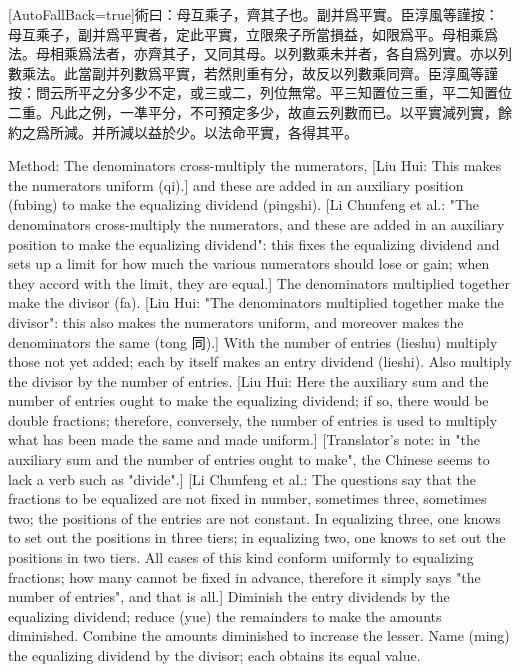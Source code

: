 \documentclass[11pt]{article}
\newcommand{\zhsmall}{\footnotesize\color{black!70}}
\newcommand{\unitlabel}[1]{\marginpar{\raggedleft\tiny\color{gray}#1}}
\newenvironment{unitzh}{\par\CJKfontspec{Noto Serif CJK SC}[AutoFallBack=true]\large\linespread{1.25}\selectfont}{\par}
\newenvironment{uniten}{\par\small\color{black!85}}{\par\medskip}
\begin{document}
\begin{unitzh}\unitlabel{jiuzhang-004.4}術曰：母互乘子，{\zhsmall 齊其子也。}副并爲平實。{\zhsmall 臣淳風等謹按：母互乘子，副并爲平實者，定此平實，立限衆子所當損益，如限爲平。}母相乘爲法。{\zhsmall 母相乘爲法者，亦齊其子，又同其母。}以列數乘未并者，各自爲列實。亦以列數乘法。{\zhsmall 此當副并列數爲平實，若然則重有分，故反以列數乘同齊。臣淳風等謹按：問云所平之分多少不定，或三或二，列位無常。平三知置位三重，平二知置位二重。凡此之例，一凖平分，不可預定多少，故直云列數而已。}以平實減列實，餘約之爲所減。并所減以益於少。以法命平實，各得其平。\end{unitzh}
\begin{uniten}Method: The denominators cross-multiply the numerators, [Liu Hui: This makes the numerators uniform (qi).] and these are added in an auxiliary position (fubing) to make the equalizing dividend (pingshi). [Li Chunfeng et al.: "The denominators cross-multiply the numerators, and these are added in an auxiliary position to make the equalizing dividend": this fixes the equalizing dividend and sets up a limit for how much the various numerators should lose or gain; when they accord with the limit, they are equal.] The denominators multiplied together make the divisor (fa). [Liu Hui: "The denominators multiplied together make the divisor": this also makes the numerators uniform, and moreover makes the denominators the same (tong 同).] With the number of entries (lieshu) multiply those not yet added; each by itself makes an entry dividend (lieshi). Also multiply the divisor by the number of entries. [Liu Hui: Here the auxiliary sum and the number of entries ought to make the equalizing dividend; if so, there would be double fractions; therefore, conversely, the number of entries is used to multiply what has been made the same and made uniform.] [Translator's note: in "the auxiliary sum and the number of entries ought to make", the Chinese seems to lack a verb such as "divide".] [Li Chunfeng et al.: The questions say that the fractions to be equalized are not fixed in number, sometimes three, sometimes two; the positions of the entries are not constant. In equalizing three, one knows to set out the positions in three tiers; in equalizing two, one knows to set out the positions in two tiers. All cases of this kind conform uniformly to equalizing fractions; how many cannot be fixed in advance, therefore it simply says "the number of entries", and that is all.] Diminish the entry dividends by the equalizing dividend; reduce (yue) the remainders to make the amounts diminished. Combine the amounts diminished to increase the lesser. Name (ming) the equalizing dividend by the divisor; each obtains its equal value.\end{uniten}
\end{document}
